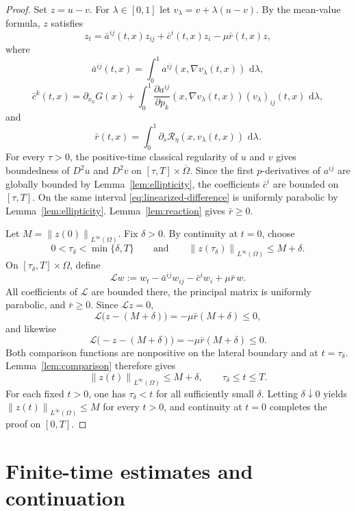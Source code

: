 \documentclass[11pt]{article}
\theoremstyle{remark}
\newcommand{\dd}{\,\mathrm{d}}
\newcommand{\norm}[1]{\left\lVert #1\right\rVert}
\newcommand{\cT}{\mathcal{R}}
\begin{document}
\begin{proof}
Set $z=u-v$.  For $\lambda\in[0,1]$ let $v_\lambda=v+\lambda(u-v)$.  By the mean-value formula, $z$ satisfies
\begin{equation}\label{eq:linearized-difference}
        z_t=\bar a^{ij}(t,x)z_{ij}+\bar c^i(t,x)z_i-
        \mu\bar r(t,x)z,
\end{equation}
where
\[
        \bar a^{ij}(t,x)=\int_0^1 a^{ij}(x,\nabla v_\lambda(t,x))\,\dd\lambda,
\]
\[
        \bar c^k(t,x)=\partial_{x_k}G(x)+
        \int_0^1
        \frac{\partial a^{ij}}{\partial p_k}(x,\nabla v_\lambda(t,x))
        (v_\lambda)_{ij}(t,x)\,\dd\lambda,
\]
and
\[
        \bar r(t,x)=\int_0^1 \partial_s\cT_\eta(x,v_\lambda(t,x))\,\dd\lambda.
\]
For every $\tau>0$, the positive-time classical regularity of $u$ and $v$ gives boundedness of $D^2u$ and $D^2v$ on $[\tau,T]\times\overline\Omega$.  Since the first $p$-derivatives of $a^{ij}$ are globally bounded by Lemma~\ref{lem:ellipticity}, the coefficients $\bar c^i$ are bounded on $[\tau,T]$.  On the same interval \eqref{eq:linearized-difference} is uniformly parabolic by Lemma~\ref{lem:ellipticity}.  Lemma~\ref{lem:reaction} gives $\bar r\ge0$.

Let $M=\norm{z(0)}_{L^\infty(\Omega)}$.  Fix $\delta>0$.  By continuity at $t=0$, choose
\[
 0<\tau_\delta<\min\{\delta,T\}
 \qquad\text{and}\qquad
 \norm{z(\tau_\delta)}_{L^\infty(\Omega)}\le M+\delta.
\]
On $[\tau_\delta,T]\times\Omega$, define
\[
\mathcal{L}w
:=
w_t-\bar a^{ij}w_{ij}-\bar c^iw_i+\mu\bar r\,w.
\]
All coefficients of $\mathcal L$ are bounded there, the principal matrix is
uniformly parabolic, and $\bar r\ge0$.  Since $\mathcal Lz=0$,
\[
 \mathcal L\bigl(z-(M+\delta)\bigr)
 =-\mu\bar r(M+\delta)\le0,
\]
and likewise
\[
 \mathcal L\bigl(-z-(M+\delta)\bigr)
 =-\mu\bar r(M+\delta)\le0.
\]
Both comparison functions are nonpositive on the lateral boundary and at
$t=\tau_\delta$.  Lemma~\ref{lem:comparison} therefore gives
\[
 \norm{z(t)}_{L^\infty(\Omega)}\le M+\delta,
 \qquad \tau_\delta\le t\le T.
\]
For each fixed $t>0$, one has $\tau_\delta<t$ for all sufficiently small
$\delta$.  Letting $\delta\downarrow0$ yields
$\norm{z(t)}_{L^\infty(\Omega)}\le M$ for every $t>0$, and continuity at
$t=0$ completes the proof on $[0,T]$.
\end{proof}

\section{Finite-time estimates and continuation}
\label{sec:continuation}
\end{document}
